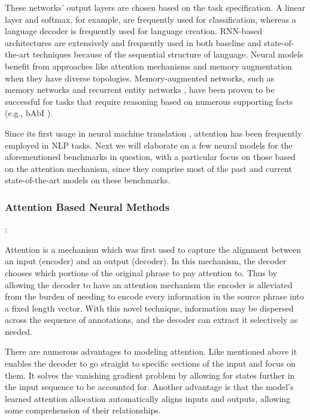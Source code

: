 These networks' output layers are chosen based on the task specification. A linear layer and softmax, for example, are frequently used for classification, whereas a language decoder is frequently used for language creation. RNN-based architectures are extensively and frequently used in both baseline \citep{bowman2015large,rashkin2018event2mind} and state-of-the-art techniques \citep {kim2019semantic,chen2018hfl,henaff2016tracking} because of the sequential structure of language. Neural models benefit from approaches like attention mechanisms and memory augmentation when they have diverse topologies. Memory-augmented networks, such as memory networks \citep{weston2014memory} and recurrent entity networks \citep{henaff2016tracking}, have been proven to be successful for tasks  that require reasoning based on numerous supporting facts (e.g., bAbI \citep{weston2015towards}).


\pagebreak


Since its first usage in neural machine translation \citep{bahdanau2014neural}, attention has been frequently employed in NLP tasks. Next we will elaborate on a few  neural models for the aforementioned benchmarks in question, with a particular focus on those based on the attention mechanism, since they comprise most of the past and current state-of-the-art models on these benchmarks. 

\subsubsection{Attention Based Neural Methods}: 

Attention is a mechanism which was first used to capture the alignment between an input (encoder) and an output (decoder). In this mechanism, the decoder chooses which portions of the original phrase to pay attention to. Thus by allowing the decoder to have an attention mechanism the encoder is alleviated from the burden of needing to encode every information in the source phrase into a fixed length vector. With this novel technique, information may be dispersed across the sequence of annotations, and the decoder can extract it selectively as needed. 

There are numerous advantages to modeling attention. Like mentioned above it enables the decoder to go straight to specific sections of the input and focus on them. It solves the vanishing gradient problem by allowing for states further in the input sequence to be accounted for. Another advantage is that the model's learned attention allocation automatically aligns inputs and outputs, allowing some comprehension of their relationships.

